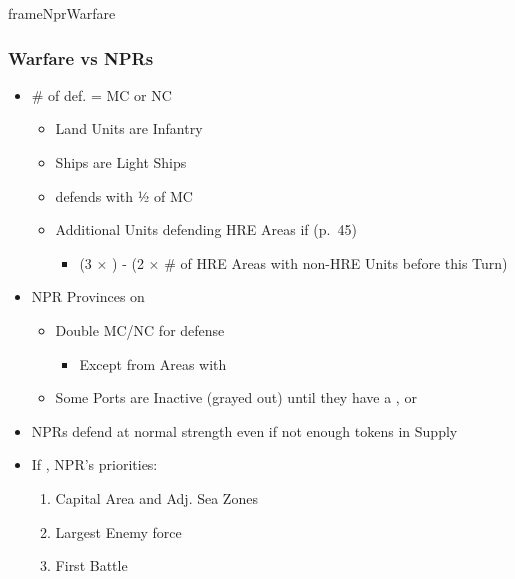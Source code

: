 \documentclass[10pt]{article}
\newlength{\fhNprWarfare} \setlength\fhNprWarfare{20\baselineskip}
\begin{document}
\begin{dynamiccontents*}{frameNprWarfare}\begin{eubox}{\fhNprWarfare}
	\subsubsection*{Warfare vs NPRs }
	\begin{itemize}
		\item {}\# of def.  = MC or NC
		\begin{itemize}
			\item Land Units are Infantry
			\item Ships are Light Ships
			\item {} defends with ½ of MC
			\item Additional Units defending HRE Areas if  (p.~45)
			\begin{itemize}
				\item (3 × \authority) - (2 × \# of HRE Areas with non-HRE Units before this Turn)
			\end{itemize}
		\end{itemize}
		\item NPR Provinces on 
		\begin{itemize}
			\item Double MC/NC for defense
			\begin{itemize}
				\item Except from Areas with \plague
			\end{itemize}
			\item Some Ports are Inactive (grayed out) until they have a \dnpr, \town or \vassal
		\end{itemize}
		\item NPRs defend at normal strength even if not enough tokens in Supply
		\item If , NPR's priorities:
		\begin{enumerate}
			\item Capital Area and Adj. Sea Zones
			\item Largest Enemy force
			\item First Battle
		\end{enumerate}
	\end{itemize}
\end{eubox}\end{dynamiccontents*}
\end{document}
